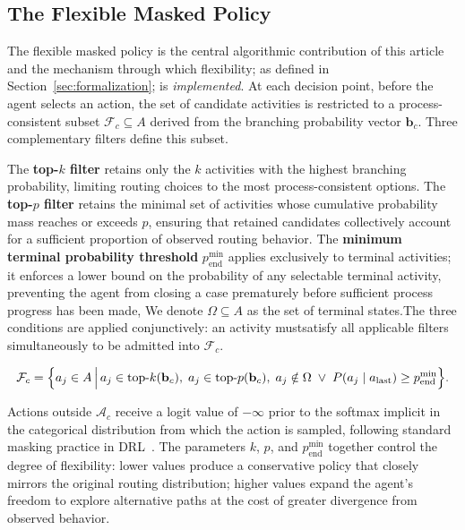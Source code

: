\documentclass[runningheads]{llncs}
\begin{document}
\subsection{The Flexible Masked Policy}
\label{subsec:mask}

The flexible masked policy is the central algorithmic contribution of this article and the mechanism through which flexibility; as defined in Section~\ref{sec:formalization}; is \textit{implemented}. At each decision point, before the agent selects an action, the set of candidate activities is restricted to a process-consistent subset $\mathcal{F}_c\subseteq A$ derived from the branching probability vector $\mathbf{b}_c$. Three complementary filters define this subset.

The \textbf{top-$k$ filter} retains only the $k$ activities with the highest branching probability, limiting routing choices to the most process-consistent options. The \textbf{top-$p$ filter} retains the minimal set of activities whose cumulative probability mass reaches or exceeds $p$, ensuring that retained candidates collectively account for a sufficient proportion of observed routing behavior. The \textbf{minimum terminal probability threshold} $p_{\mathrm{end}}^{\min}$ applies exclusively to terminal activities; it enforces a lower bound on the probability of any selectable terminal activity, preventing the agent from closing a case prematurely before sufficient process progress has been made, We denote $\Omega\subseteq A$  as the set of terminal states.The three conditions are applied conjunctively: an activity mustsatisfy all applicable filters simultaneously to be admitted into $\mathcal{F}_c$.


\[
\mathcal{F}_c
=
\Bigl\{a_j\in A \,\Big|\,
a_j\in \mathrm{top}\text{-}k(\mathbf{b}_c),\;
a_j\in \mathrm{top}\text{-}p(\mathbf{b}_c),\;
a_j \notin \Omega
\;\lor\;
P(a_j\mid a_{\text{last}})\ge p_{\mathrm{end}}^{\min}
\Bigr\}.
\]


Actions outside $\mathcal{A}_c$ receive a logit value of $-\infty$ prior to the softmax implicit in the categorical distribution from which the action is sampled, following standard masking practice in DRL~\cite{Learning_policies_drl}. The parameters $k$, $p$, and $p_{\mathrm{end}}^{\min}$ together control the degree of flexibility: lower values produce a conservative policy that closely mirrors the original routing distribution; higher values expand the agent's freedom to explore alternative paths at the cost of greater divergence from observed behavior.
\end{document}
